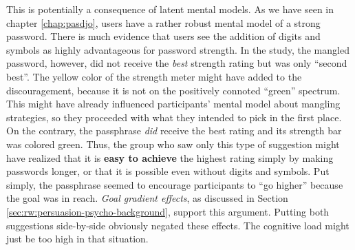 This is potentially a consequence of latent mental models. As we have seen in chapter \ref{chap:pasdjo}, users have a rather robust mental model of a strong password. There is much evidence that users see the addition of digits and symbols as highly advantageous for password strength. In the study, the mangled password, however, did not receive the \textit{best} strength rating but was only ``second best''. The yellow color of the strength meter might have added to the discouragement, because it is not on the positively connoted ``green'' spectrum. This might have already influenced participants' mental model about mangling strategies, so they proceeded with what they intended to pick in the first place. On the contrary, the passphrase \textit{did} receive the best rating and its strength bar was colored green. Thus, the group who saw only this type of suggestion might have realized that it is \textbf{easy to achieve} the highest rating simply by making passwords longer, or that it is possible even without digits and symbols. Put simply, the passphrase seemed to encourage participants to ``go higher'' because the goal was in reach. \textit{Goal gradient effects}, as discussed in Section \ref{sec:rw:persuasion-psycho-background}, support this argument. Putting both suggestions side-by-side obviously negated these effects. The cognitive load might just be too high in that situation. 



